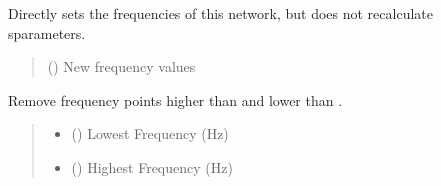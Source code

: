\documentclass[letterpaper,10pt,english]{sphinxmanual}
\begin{document}
\begin{fulllineitems}

\begin{fulllineitems}
\label{\detokenize{touchstone:touchstone.spfile.set_frequencies_wo_recalc}}
\pysigstartsignatures
{}
\pysigstopsignatures
\sphinxAtStartPar
Directly sets the frequencies of this network, but does not re\sphinxhyphen{}calculate s\sphinxhyphen{}parameters.
\begin{quote}\begin{description}
\sphinxAtStartPar
{} () \textendash{} New frequency values

\end{description}\end{quote}

\end{fulllineitems}


\begin{fulllineitems}
\label{\detokenize{touchstone:touchstone.spfile.set_frequency_limits}}
\pysigstartsignatures
{}
\pysigstopsignatures
\sphinxAtStartPar
Remove frequency points higher than  and lower than .
\begin{quote}\begin{description}
\begin{itemize}
\item {} 
\sphinxAtStartPar
{} () \textendash{} Lowest Frequency (Hz)

\item {} 
\sphinxAtStartPar
{} () \textendash{} Highest Frequency (Hz)


\end{itemize}
\end{description}
\end{quote}
\end{fulllineitems}
\end{fulllineitems}
\end{document}
